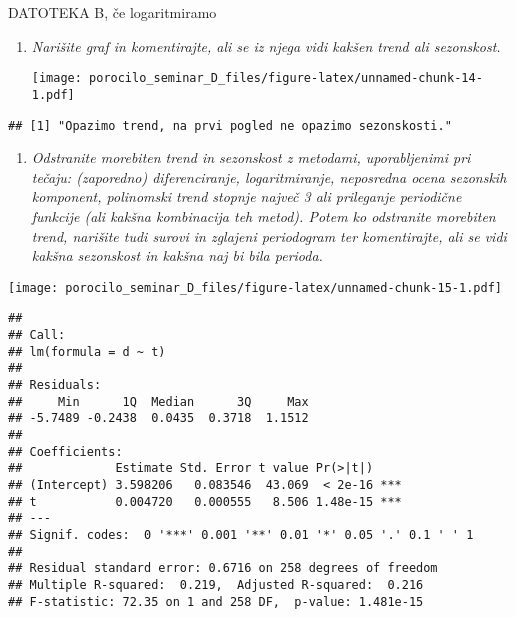 \documentclass[
]{article}
\providecommand{\tightlist}{%
  \setlength{\itemsep}{0pt}\setlength{\parskip}{0pt}}
\begin{document}
DATOTEKA B, če logaritmiramo

\begin{enumerate}
\def\labelenumi{\arabic{enumi}.}
\tightlist
\item
  \emph{Narišite graf in komentirajte, ali se iz njega vidi kakšen trend
  ali sezonskost.}

  \texttt{[image: porocilo\_seminar\_D\_files/figure-latex/unnamed-chunk-14-1.pdf]}
\end{enumerate}

\begin{verbatim}
## [1] "Opazimo trend, na prvi pogled ne opazimo sezonskosti."
\end{verbatim}

\begin{enumerate}
\def\labelenumi{\arabic{enumi}.}
\setcounter{enumi}{1}
\tightlist
\item
  \emph{Odstranite morebiten trend in sezonskost z metodami,
  uporabljenimi pri tečaju: (zaporedno) diferenciranje, logaritmiranje,
  neposredna ocena sezonskih komponent, polinomski trend stopnje največ
  3 ali prileganje periodične funkcije (ali kakšna kombinacija teh
  metod). Potem ko odstranite morebiten trend, narišite tudi surovi in
  zglajeni periodogram ter komentirajte, ali se vidi kakšna sezonskost
  in kakšna naj bi bila perioda.}
\end{enumerate}

\texttt{[image: porocilo\_seminar\_D\_files/figure-latex/unnamed-chunk-15-1.pdf]}

\begin{verbatim}
## 
## Call:
## lm(formula = d ~ t)
## 
## Residuals:
##     Min      1Q  Median      3Q     Max 
## -5.7489 -0.2438  0.0435  0.3718  1.1512 
## 
## Coefficients:
##             Estimate Std. Error t value Pr(>|t|)    
## (Intercept) 3.598206   0.083546  43.069  < 2e-16 ***
## t           0.004720   0.000555   8.506 1.48e-15 ***
## ---
## Signif. codes:  0 '***' 0.001 '**' 0.01 '*' 0.05 '.' 0.1 ' ' 1
## 
## Residual standard error: 0.6716 on 258 degrees of freedom
## Multiple R-squared:  0.219,  Adjusted R-squared:  0.216 
## F-statistic: 72.35 on 1 and 258 DF,  p-value: 1.481e-15
\end{verbatim}
\end{document}

